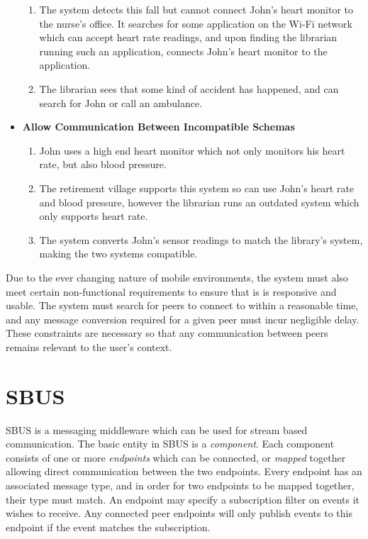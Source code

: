 \documentclass[12pt,twoside,notitlepage]{report}
\begin{document}
\begin{itemize}
\begin{enumerate}
\item The system detects this fall but cannot connect John's heart monitor to the nurse's office. It searches for some application on the Wi-Fi network which can accept heart rate readings, and upon finding the librarian running such an application, connects John's heart monitor to the application.

\item The librarian sees that some kind of accident has happened, and can search for John or call an ambulance.

\end{enumerate}

\item {\bf Allow Communication Between Incompatible Schemas}

\begin{enumerate}

\item John uses a high end heart monitor which not only monitors his heart rate, but also blood pressure.

\item The retirement village supports this system so can use John's heart rate and blood pressure, however the librarian runs an outdated system which only supports heart rate.

\item The system converts John's sensor readings to match the library's system, making the two systems compatible.

\end{enumerate}

\end{itemize}

Due to the ever changing nature of mobile environments, the system must also meet certain non-functional requirements to ensure that is is responsive and usable. 
The system must search for peers to connect to within a reasonable time, and any message conversion required for a given peer must incur negligible delay.
These constraints are necessary so that any communication between peers remains relevant to the user's context.

\section{SBUS}

SBUS \cite{ingram2009reconfigurable} is a messaging middleware which can be used for stream based communication. 
The basic entity in SBUS is a {\sl component}. 
Each component consists of one or more {\sl endpoints} which can be connected, or {\sl mapped} together allowing direct communication between the two endpoints. 
Every endpoint has an associated message type, and in order for two endpoints to be mapped together, their type must match. 
An endpoint may specify a subscription filter on events it wishes to receive. Any connected peer endpoints will only publish events to this endpoint if the event matches the subscription.
\end{document}
